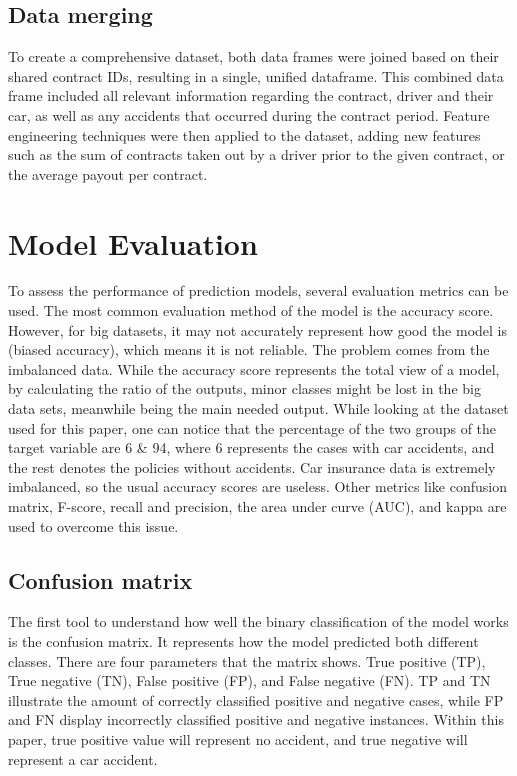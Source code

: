 \documentclass{IEEEtran}
\begin{document}
\subsection{Data merging}

To create a comprehensive dataset, both data frames were joined based on their shared contract IDs, resulting in a single, unified dataframe. This combined data frame included all relevant information regarding the contract, driver and their car, as well as any accidents that occurred during the contract period. Feature engineering techniques were then applied to the dataset, adding new features such as the sum of contracts taken out by a driver prior to the given contract, or the average payout per contract. 




\section{Model Evaluation  }

To assess the performance of prediction models, several evaluation metrics can be used. The most common evaluation method of the model is the accuracy score. However, for big datasets, it may not accurately represent how good the model is (biased accuracy), which means it is not reliable. The problem comes from the imbalanced data. While the accuracy score represents the total view of a model, by calculating the ratio of the outputs, minor classes might be lost in the big data sets, meanwhile being the main needed output. While looking at the dataset used for this paper, one can notice that the percentage of the two groups of the target variable are 6\text{\%} & 94\text{\%}, where 6\text{\%} represents the cases with car accidents, and the rest denotes the policies without accidents. Car insurance data is extremely imbalanced, so the usual accuracy scores are useless. Other metrics like confusion matrix, F-score, recall and precision, the area under curve (AUC), and kappa are used to overcome this issue.


\subsection{Confusion matrix}

The first tool to understand how well the binary classification of the model works is the confusion matrix. It represents how the model predicted both different classes. There are four parameters that the matrix shows. True positive (TP), True negative (TN), False positive (FP), and False negative (FN). TP and TN illustrate the amount of correctly classified positive and negative cases, while  FP and FN display incorrectly classified positive and negative instances. Within this paper, true positive value will represent no accident, and true negative will represent a car accident.
\end{document}
